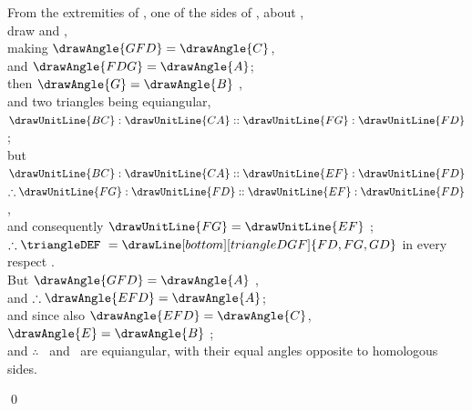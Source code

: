 \documentclass[booklanguage=english]{byrnebook}
\begin{document}
\begin{center}
From the extremities of , one of the sides of \triangleDEF, about ,\\
draw  and ,\\
making $\drawAngle{GFD} = \drawAngle{C}$,\\
and $\drawAngle{FDG} = \drawAngle{A}$;\\
then $\drawAngle{G} = \drawAngle{B}$ ,\\
and two triangles being equiangular,\\
$\drawUnitLine{BC} : \drawUnitLine{CA} :: \drawUnitLine{FG} : \drawUnitLine{FD}$ ;\\
but $\drawUnitLine{BC} : \drawUnitLine{CA} :: \drawUnitLine{EF} : \drawUnitLine{FD}$ \byref{\hypref}\\
$\therefore \drawUnitLine{FG} : \drawUnitLine{FD} :: \drawUnitLine{EF} : \drawUnitLine{FD}$ ,\\
and consequently $\drawUnitLine{FG} = \drawUnitLine{EF}$ ;\\
$\therefore \triangleDEF\ =
\drawLine[bottom][triangleDGF]{FD,FG,GD}$ in every respect .\\
But $\drawAngle{GFD} = \drawAngle{A}$ \byref{\constref},\\
and $\therefore \drawAngle{EFD} = \drawAngle{A}$;\\
and since also $\drawAngle{EFD} = \drawAngle{C}$,\\
$\drawAngle{E} = \drawAngle{B}$ ;\\
and $\therefore$ \triangleABC\ and \triangleDEF\ are equiangular, with their equal angles opposite to homologous sides.
\end{center}

\qed
\end{document}
